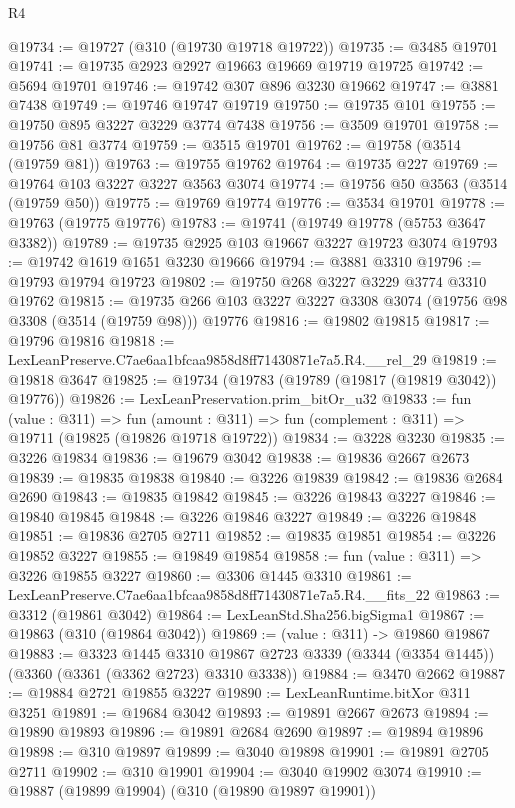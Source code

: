 \begin{lexlean}{R4}
\begin{coremodule}
@19734 := @19727 (@310 (@19730 @19718 @19722))
@19735 := @3485 @19701
@19741 := @19735 @2923 @2927 @19663 @19669 @19719 @19725
@19742 := @5694 @19701
@19746 := @19742 @307 @896 @3230 @19662
@19747 := @3881 @7438
@19749 := @19746 @19747 @19719
@19750 := @19735 @101
@19755 := @19750 @895 @3227 @3229 @3774 @7438
@19756 := @3509 @19701
@19758 := @19756 @81 @3774
@19759 := @3515 @19701
@19762 := @19758 (@3514 (@19759 @81))
@19763 := @19755 @19762
@19764 := @19735 @227
@19769 := @19764 @103 @3227 @3227 @3563 @3074
@19774 := @19756 @50 @3563 (@3514 (@19759 @50))
@19775 := @19769 @19774
@19776 := @3534 @19701
@19778 := @19763 (@19775 @19776)
@19783 := @19741 (@19749 @19778 (@5753 @3647 @3382))
@19789 := @19735 @2925 @103 @19667 @3227 @19723 @3074
@19793 := @19742 @1619 @1651 @3230 @19666
@19794 := @3881 @3310
@19796 := @19793 @19794 @19723
@19802 := @19750 @268 @3227 @3229 @3774 @3310 @19762
@19815 := @19735 @266 @103 @3227 @3227 @3308 @3074 (@19756 @98 @3308 (@3514 (@19759 @98))) @19776
@19816 := @19802 @19815
@19817 := @19796 @19816
@19818 := LexLeanPreserve.C7ae6aa1bfcaa9858d8ff71430871e7a5.R4.__rel_29
@19819 := @19818 @3647
@19825 := @19734 (@19783 (@19789 (@19817 (@19819 @3042)) @19776))
@19826 := LexLeanPreservation.prim_bitOr_u32
@19833 := fun (value : @311) =>
  fun (amount : @311) => fun (complement : @311) => @19711 (@19825 (@19826 @19718 @19722))
@19834 := @3228 @3230
@19835 := @3226 @19834
@19836 := @19679 @3042
@19838 := @19836 @2667 @2673
@19839 := @19835 @19838
@19840 := @3226 @19839
@19842 := @19836 @2684 @2690
@19843 := @19835 @19842
@19845 := @3226 @19843 @3227
@19846 := @19840 @19845
@19848 := @3226 @19846 @3227
@19849 := @3226 @19848
@19851 := @19836 @2705 @2711
@19852 := @19835 @19851
@19854 := @3226 @19852 @3227
@19855 := @19849 @19854
@19858 := fun (value : @311) => @3226 @19855 @3227
@19860 := @3306 @1445 @3310
@19861 := LexLeanPreserve.C7ae6aa1bfcaa9858d8ff71430871e7a5.R4.__fits_22
@19863 := @3312 (@19861 @3042)
@19864 := LexLeanStd.Sha256.bigSigma1
@19867 := @19863 (@310 (@19864 @3042))
@19869 := (value : @311) -> @19860 @19867
@19883 := @3323
    @1445
    @3310
    @19867
    @2723
    @3339
    (@3344 (@3354 @1445))
    (@3360 (@3361 (@3362 @2723) @3310 @3338))
@19884 := @3470 @2662
@19887 := @19884 @2721 @19855 @3227
@19890 := LexLeanRuntime.bitXor @311 @3251
@19891 := @19684 @3042
@19893 := @19891 @2667 @2673
@19894 := @19890 @19893
@19896 := @19891 @2684 @2690
@19897 := @19894 @19896
@19898 := @310 @19897
@19899 := @3040 @19898
@19901 := @19891 @2705 @2711
@19902 := @310 @19901
@19904 := @3040 @19902 @3074
@19910 := @19887 (@19899 @19904) (@310 (@19890 @19897 @19901))

\end{coremodule}
\end{lexlean}
